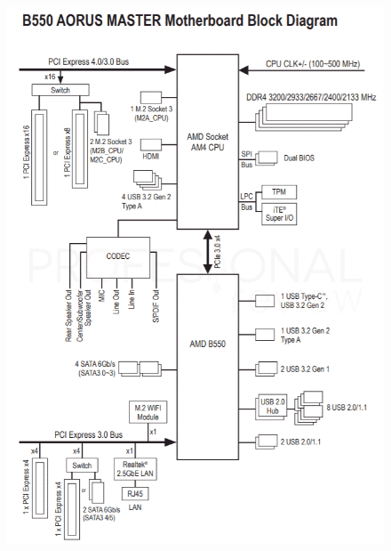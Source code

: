 \documentclass{article}
\begin{document}
        \begin{figure}[h]
          \centering
          \includegraphics[scale = 0.4]{img/block_diagram.png}
        \end{figure}
        
\end{document}
